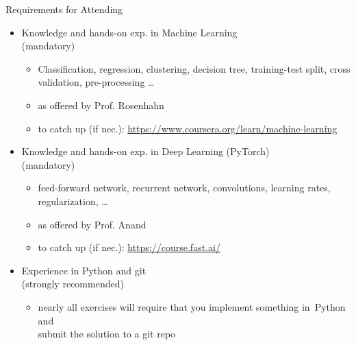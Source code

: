 \documentclass[aspectratio=169]{../latex_main/tntbeamer}  %
\begin{document}
\begin{frame}[c]{Requirements for Attending}

\begin{itemize}
  \item Knowledge and hands-on exp. in \alert{Machine Learning}\\ (mandatory)
  \begin{itemize}
    \item Classification, regression, clustering, decision tree, training-test split, cross validation, pre-processing \ldots
    \item as offered by Prof. Rosenhahn
    \item to catch up (if nec.): \url{https://www.coursera.org/learn/machine-learning} 
  \end{itemize}
  \pause
  \item Knowledge and hands-on exp. in \alert{Deep Learning} (PyTorch)\\ (mandatory)
  \begin{itemize}
    \item feed-forward network, recurrent network, convolutions, learning rates, regularization, \ldots 
    \item as offered by Prof. Anand
    \item to catch up (if nec.): \url{https://course.fast.ai/}
  \end{itemize}
  \pause
  \item Experience in \alert{Python and git}\\ (strongly recommended)
  \begin{itemize}
    \item nearly all exercises will require 
    that you implement something in~Python and\\ submit the solution to a git repo
  \end{itemize}
\end{itemize}

\end{frame}
\end{document}
